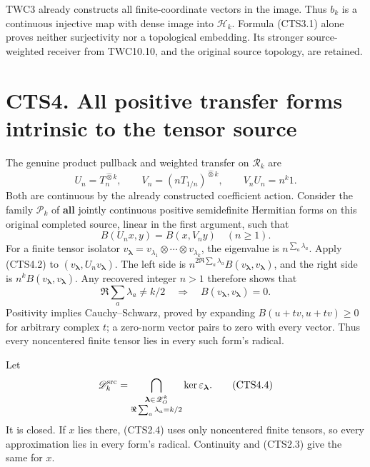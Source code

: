 TWC3 already constructs all finite-coordinate vectors in the image. Thus
\(b_k\) is a continuous injective map with dense image into
\(\mathscr H_k\). Formula (CTS3.1) alone proves neither surjectivity nor
a topological embedding. Its stronger source-weighted receiver from
TWC10.10, and the original source topology, are retained.

\section{CTS4. All positive transfer forms intrinsic to the tensor
source}\label{cts4.-all-positive-transfer-forms-intrinsic-to-the-tensor-source}

The genuine product pullback and weighted transfer on \(\mathscr R_k\)
are \[
U_n=T_n^{\widehat\otimes k},\qquad V_n=(nT_{1/n})^{\widehat\otimes k},\qquad V_nU_n=n^k1.
\tag{CTS4.1}
\] Both are continuous by the already constructed coefficient action.
Consider the family \(\mathcal P_k\) of \textbf{all} jointly continuous
positive semidefinite Hermitian forms on this original completed source,
linear in the first argument, such that \[
B(U_nx,y)=B(x,V_ny)\quad(n\ge1).
\tag{CTS4.2}
\] For a finite tensor isolator
\(v_{\boldsymbol\lambda}=v_{\lambda_1}\otimes\cdots\otimes v_{\lambda_k}\),
the eigenvalue is \(n^{\sum_a\lambda_a}\). Apply (CTS4.2) to
\((v_{\boldsymbol\lambda},U_nv_{\boldsymbol\lambda})\). The left side is
\(n^{2\Re\sum_a\lambda_a}B(v_{\boldsymbol\lambda},v_{\boldsymbol\lambda})\),
and the right side is
\(n^k B(v_{\boldsymbol\lambda},v_{\boldsymbol\lambda})\). Any recovered
integer \(n>1\) therefore shows that \[
\Re\sum_a\lambda_a\ne k/2
\quad\Longrightarrow\quad B(v_{\boldsymbol\lambda},v_{\boldsymbol\lambda})=0.
\tag{CTS4.3}
\] Positivity implies Cauchy--Schwarz, proved by expanding
\(B(u+tv,u+tv)\ge0\) for arbitrary complex \(t\); a zero-norm vector
pairs to zero with every vector. Thus every noncentered finite tensor
lies in every such form's radical.

Let \[
\mathscr D_k^{\rm src}=\bigcap_{\substack{\boldsymbol\lambda\in\mathscr Z_O^k\\\Re\sum_a\lambda_a=k/2}}
\ker\varepsilon_{\boldsymbol\lambda}.
\tag{CTS4.4}
\] It is closed. If \(x\) lies there, (CTS2.4) uses only noncentered
finite tensors, so every approximation lies in every form's radical.
Continuity and (CTS2.3) give the same for \(x\).

